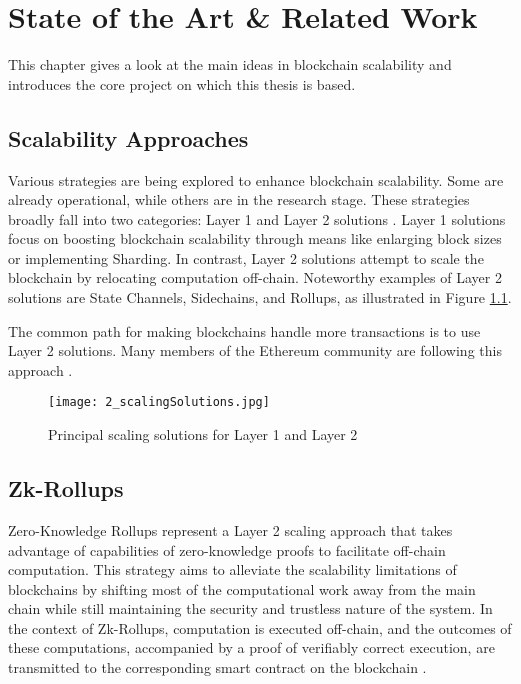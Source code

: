 \chapter{State of the Art \& Related Work}
\label{cha:chapter2}


This chapter gives a look at the main ideas in blockchain scalability and introduces the core project on which this thesis is based.

\section{Scalability Approaches}
Various strategies are being explored to enhance blockchain scalability. Some are already operational, while others are in the research stage. These strategies broadly fall into two categories: Layer 1 and Layer 2 solutions \cite{tyagi_study_2021,thibault_blockchain_2022}. Layer 1 solutions focus on boosting blockchain scalability through means like enlarging block sizes or implementing Sharding. In contrast, Layer 2 solutions attempt to scale the blockchain by relocating computation off-chain. Noteworthy examples of Layer 2 solutions are State Channels, Sidechains, and Rollups, as illustrated in Figure \ref{fig:2_scalingSolutions}.

The common path for making blockchains handle more transactions is to use Layer 2 solutions. Many members of the Ethereum community are following this approach \cite{neiheiser_practical_2023}.

\begin{figure}[ht]
  \centering
  \texttt{[image: 2\_scalingSolutions.jpg]}
  \caption[Scaling Solutions]{Principal scaling solutions for Layer 1 and Layer 2\footnotemark}  
  \label{fig:2_scalingSolutions}
\end{figure} 

\section{Zk-Rollups}
\label{sec:2_zkRollups}
Zero-Knowledge Rollups represent a Layer 2 scaling approach that takes advantage of capabilities of zero-knowledge proofs to facilitate off-chain computation. This strategy aims to alleviate the scalability limitations of blockchains by shifting most of the computational work away from the main chain while still maintaining the security and trustless nature of the system. In the context of Zk-Rollups, computation is executed off-chain, and the outcomes of these computations, accompanied by a proof of verifiably correct execution, are transmitted to the corresponding smart contract on the blockchain \cite{tyagi_study_2021}.


